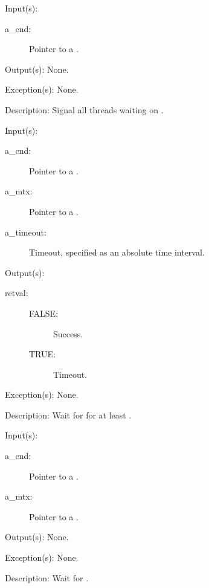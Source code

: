 \begin{capi}
	\begin{capilist}
	\item[Input(s): ]
		\begin{description}\item[]
		\item[a\_cnd: ]
			Pointer to a .
		\end{description}
	\item[Output(s): ] None.
	\item[Exception(s): ] None.
	\item[Description: ]
		Signal all threads waiting on .
	\end{capilist}
\label{cnd_timedwait}
	\begin{capilist}
	\item[Input(s): ]
		\begin{description}\item[]
		\item[a\_cnd: ]
			Pointer to a \classname{cnd}.
		\item[a\_mtx: ]
			Pointer to a \classname{mtx}.
		\item[a\_timeout: ]
			Timeout, specified as an absolute time interval.
		\end{description}
	\item[Output(s): ]
		\begin{description}\item[]
		\item[retval: ]
			\begin{description}\item[]
			\item[FALSE: ] Success.
			\item[TRUE: ] Timeout.
			\end{description}
		\end{description}
	\item[Exception(s): ] None.
	\item[Description: ]
		Wait for  for at least \cvar{a\_time}.
	\end{capilist}
\label{cnd_wait}
	\begin{capilist}
	\item[Input(s): ]
		\begin{description}\item[]
		\item[a\_cnd: ]
			Pointer to a .
		\item[a\_mtx: ]
			Pointer to a .
		\end{description}
	\item[Output(s): ] None.
	\item[Exception(s): ] None.
	\item[Description: ]
		Wait for \cvar{a\_cnd}.
	\end{capilist}
\end{capi}
